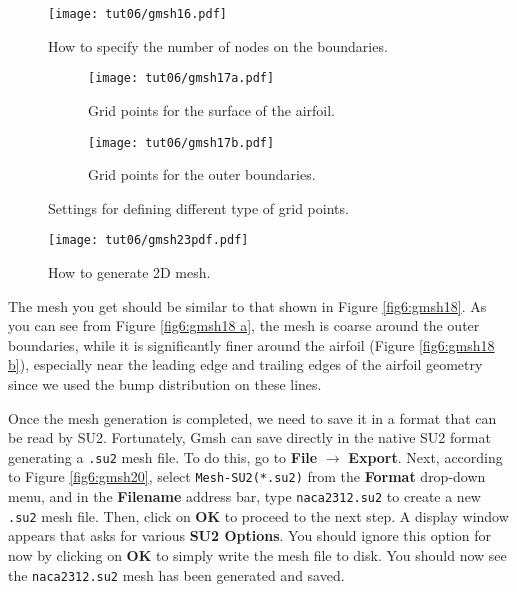 \begin{figure}[ht]
    \centering
    \texttt{[image: tut06/gmsh16.pdf]}
    \caption{How to specify the number of nodes on the boundaries.}
    \label{fig6:gmsh16}
\end{figure}
\begin{figure}[ht]
    \centering
     \begin{subfigure}[b]{.4\textwidth}
         \centering
         \texttt{[image: tut06/gmsh17a.pdf]}
         \caption{Grid points for the surface of the airfoil.}
         \label{fig6:gmsh17 a}
     \end{subfigure}
     \hfill
     \begin{subfigure}[b]{.4\textwidth}
         \centering
         \texttt{[image: tut06/gmsh17b.pdf]}
         \caption{Grid points for the outer boundaries.}
         \label{fig6:gmsh17 b}
     \end{subfigure}  
    \caption{Settings for defining different type of grid points.}
    \label{fig6:gmsh17}
\end{figure}

\begin{figure}[ht]
    \centering
    \texttt{[image: tut06/gmsh23pdf.pdf]}
    \caption{How to generate 2D mesh.}
    \label{fig6:gmsh23}
\end{figure}
The mesh you get should be similar to that shown in Figure \ref{fig6:gmsh18}. As you can see from Figure \ref{fig6:gmsh18 a}, the mesh is coarse around the outer boundaries, while it is significantly finer around the airfoil (Figure \ref{fig6:gmsh18 b}), especially near the leading edge and trailing edges of the airfoil geometry since we used the bump distribution on these lines.

Once the mesh generation is completed, we need to save it in a format that can be read by SU2. Fortunately, Gmsh can save directly in the native SU2 format generating a \texttt{.su2} mesh file. To do this, go to \textbf{File} $\rightarrow$ \textbf{Export}. Next, according to Figure \ref{fig6:gmsh20}, select \texttt{Mesh-SU2(*.su2)} from the \textbf{Format} drop-down menu, and in the \textbf{Filename} address bar, type \texttt{naca2312.su2} to create a new \texttt{.su2} mesh file. Then, click on \textbf{OK} to proceed to the next step. A display window appears that asks for various \textbf{SU2 Options}. You should ignore this option for now by clicking on \textbf{OK} to simply write the mesh file to disk. You should now see the \texttt{naca2312.su2} mesh has been generated and saved.

